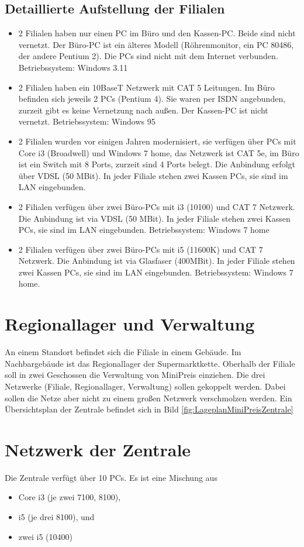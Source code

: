 \documentclass[a4paper,10pt]{scrreprt}
\begin{document}
\subsection{Detaillierte Aufstellung der Filialen}
\begin{itemize}
 \item 2 Filialen haben nur einen PC im Büro und den Kassen-PC. Beide sind nicht vernetzt. Der Büro-PC ist ein älteres Modell (Röhrenmonitor, ein PC 80486, der andere Pentium 2). Die PCs sind nicht mit dem Internet verbunden. Betriebssystem: Windows 3.11
 \item 2 Filialen haben ein 10BaseT Netzwerk mit CAT 5 Leitungen. Im Büro befinden sich jeweils 2 PCs (Pentium 4). Sie waren per ISDN angebunden, zurzeit gibt es keine Vernetzung nach außen. Der Kassen-PC ist nicht vernetzt. Betriebssystem: Windows 95
 \item 2 Filialen wurden vor einigen Jahren modernisiert, sie verfügen über PCs mit Core i3 (Broadwell) und Windows 7 home, das Netzwerk ist CAT 5e, im Büro ist ein Switch mit 8 Ports, zurzeit sind 4 Ports belegt. Die Anbindung erfolgt über VDSL (50 MBit). In jeder Filiale stehen zwei Kassen PCs, sie sind im LAN eingebunden.
 \item 2 Filialen verfügen über zwei Büro-PCs mit i3 (10100) und CAT 7 Netzwerk. Die Anbindung ist via VDSL (50 MBit). In jeder Filiale stehen zwei Kassen PCs, sie sind im LAN eingebunden. Betriebssystem: Windows 7 home
 \item 2 Filialen verfügen über zwei Büro-PCs mit i5 (11600K) und CAT 7 Netzwerk. Die Anbindung ist via Glasfaser (400MBit). In jeder Filiale stehen zwei Kassen PCs, sie sind im LAN eingebunden. Betriebssystem: Windows 7 home.
\end{itemize}

\section{Regionallager und Verwaltung}
An einem Standort befindet sich die Filiale in einem Gebäude. Im Nachbargebäude ist das Regionallager der Supermarktkette. Oberhalb der Filiale soll in zwei Geschossen die Verwaltung von MiniPreis einziehen.
Die drei Netzwerke (Filiale, Regionallager, Verwaltung) sollen gekoppelt werden. Dabei sollen die Netze aber nicht zu einem großen Netzwerk verschmolzen werden. Ein Übersichtsplan der Zentrale befindet sich in Bild \ref{fig:LageplanMiniPreisZentrale}

\section{Netzwerk der Zentrale}
Die Zentrale verfügt über 10 PCs. Es ist eine Mischung aus
\begin{itemize}
 \item Core i3 (je zwei 7100, 8100),
 \item i5 (je drei 8100), und
 \item zwei i5 (10400)
\end{itemize}
\end{document}
